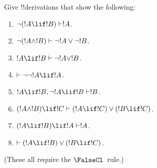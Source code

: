 \documentclass[../../../include/open-logic-section]{subfiles}
\begin{document}
\begin{prob}
Give !!{derivation}s that show the following:
\begin{enumerate}
\item $\lnot(!A \lif !B) \Proves !A$.
\item $\lnot(!A \land !B) \Proves \lnot !A \lor \lnot !B$.
\item $!A \lif !B \Proves \lnot !A \lor !B$.
\item $\Proves \lnot \lnot !A \lif !A$.
\item $!A \lif !B, \lnot !A \lif !B \Proves !B$.
\item $(!A \land !B) \lif !C \Proves (!A \lif !C) \lor (!B \lif !C)$.
\item $(!A \lif !B) \lif !A \Proves !A$.
\item $\Proves (!A \lif !B) \lor (!B \lif !C)$.
\end{enumerate}
(These all require the $\FalseCl$~rule.)
\end{prob}
\end{document}

